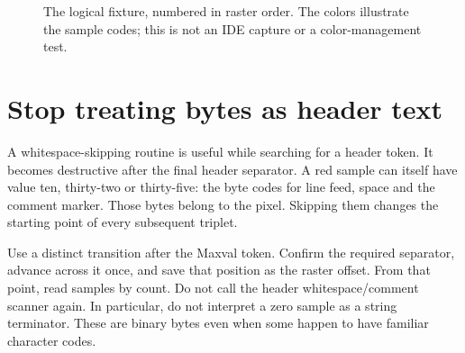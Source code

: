 \begin{figure}[htbp]
  \centering
  \caption{The logical fixture, numbered in raster order. The colors illustrate the sample codes; this is not an IDE capture or a color-management test.}\label{ppm-logical-fixture}
\end{figure}

\section{Stop treating bytes as header text}
A whitespace-skipping routine is useful while searching for a header token. It becomes
destructive after the final header separator. A red sample can itself have value ten,
thirty-two or thirty-five: the byte codes for line feed, space and the comment marker.
Those bytes belong to the pixel. Skipping them changes the starting point of every
subsequent triplet.

Use a distinct transition after the Maxval token. Confirm the required separator,
advance across it once, and save that position as the raster offset. From that point,
read samples by count. Do not call the header whitespace/comment scanner again. In
particular, do not interpret a zero sample as a string terminator. These are binary
bytes even when some happen to have familiar character codes.
